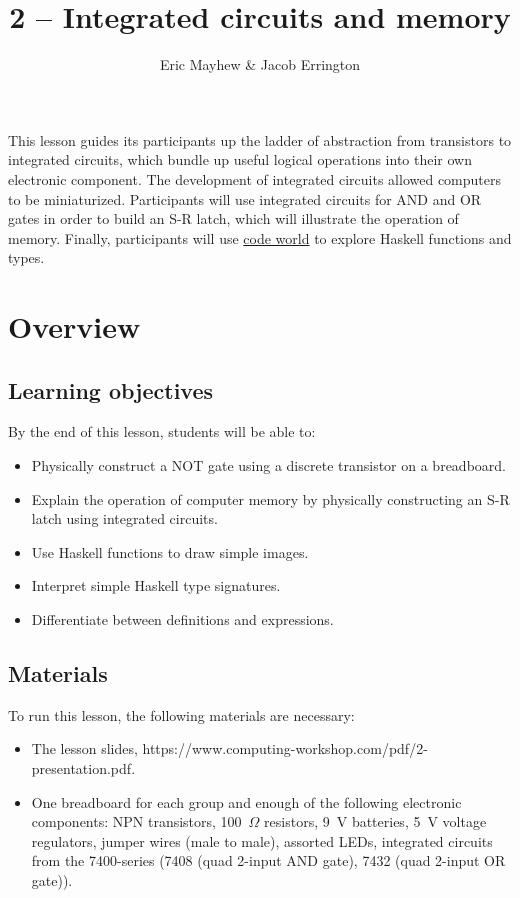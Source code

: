 \documentclass[11pt]{article}
\title{2 -- Integrated circuits and memory}
\author{Eric Mayhew \& Jacob Errington}
\date{}
\newcommand{\cwurl}{https://www.computing-workshop.com/}
\newcommand{\cwpdf}{\cwurl pdf/}
\newcommand{\codeworld}{\href{http://code.world/}{code world}}
\begin{document}
\maketitle

This lesson guides its participants up the ladder of abstraction from
transistors to integrated circuits, which bundle up useful logical operations
into their own electronic component. The development of integrated circuits
allowed computers to be miniaturized. Participants will use integrated circuits
for AND and OR gates in order to build an S-R latch, which will illustrate the
operation of memory. Finally, participants will use \codeworld{} to explore
Haskell functions and types.

\section*{Overview}

\subsection*{Learning objectives}

By the end of this lesson, students will be able to:
%
\begin{itemize}
\item Physically construct a NOT gate using a discrete transistor on a breadboard.
\item Explain the operation of computer memory by physically constructing an S-R
  latch using integrated circuits.
\item Use Haskell functions to draw simple images.
\item Interpret simple Haskell type signatures.
\item Differentiate between definitions and expressions.
\end{itemize}

\subsection*{Materials}

To run this lesson, the following materials are necessary:

\begin{itemize}
\item The lesson slides, \cwpdf{2-presentation.pdf}.
\item One breadboard for each group and enough of the following electronic
  components:
  NPN transistors,
  100~$\Omega$ resistors,
  9~V batteries,
  5~V voltage regulators,
  jumper wires (male to male),
  assorted LEDs,
  integrated circuits from the 7400-series (7408 (quad 2-input AND gate), 7432
  (quad 2-input OR gate)).
\end{itemize}
\end{document}
